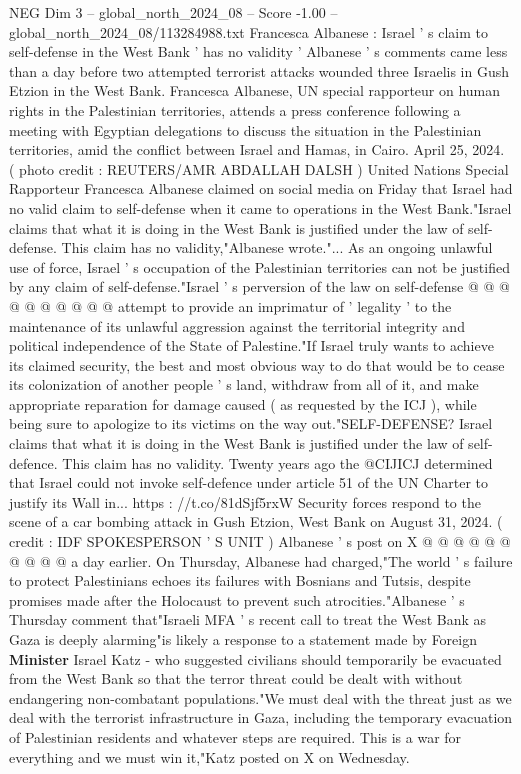 \begin{textsample}{NEG Dim 3 – global\_north\_2024\_08 – Score -1.00 – global\_north\_2024\_08/113284988.txt}  \label{ex:f3_neg_324}
Francesca Albanese : Israel ' s claim to self-defense in the West Bank ' has no validity ' Albanese ' s comments came less than a day before two attempted terrorist attacks wounded three Israelis in Gush Etzion in the West Bank.
Francesca Albanese, UN special rapporteur on human rights in the Palestinian territories, attends a press conference following a meeting with Egyptian delegations to discuss the situation in the Palestinian territories, amid the conflict between Israel and Hamas, in Cairo.
April 25, 2024. ( photo credit : REUTERS/AMR ABDALLAH DALSH ) United Nations Special Rapporteur Francesca Albanese claimed on social media on Friday that Israel had no valid claim to self-defense when it came to operations in the West Bank."Israel claims that what it is doing in the West Bank is justified under the law of self-defense.
This claim has no validity,"Albanese wrote."...
As an ongoing unlawful use of force, Israel ' s occupation of the Palestinian territories can not be justified by any claim of self-defense."Israel ' s perversion of the law on self-defense @ @ @ @ @ @ @ @ @ @ attempt to provide an imprimatur of ' legality ' to the maintenance of its unlawful aggression against the territorial integrity and political independence of the State of Palestine."If Israel truly wants to achieve its claimed security, the best and most obvious way to do that would be to cease its colonization of another people ' s land, withdraw from all of it, and make appropriate reparation for damage caused ( as requested by the ICJ ), while being sure to apologize to its victims on the way out."SELF-DEFENSE?
Israel claims that what it is doing in the West Bank is justified under the law of self-defence.
This claim has no validity.
Twenty years ago the @CIJICJ determined that Israel could not invoke self-defence under article 51 of the UN Charter to justify its Wall in... https : //t.co/81dSjf5rxW Security forces respond to the scene of a car bombing attack in Gush Etzion, West Bank on August 31, 2024. ( credit : IDF SPOKESPERSON ' S UNIT ) Albanese ' s post on X @ @ @ @ @ @ @ @ @ @ a day earlier.
On Thursday, Albanese had charged,"The world ' s failure to protect Palestinians echoes its failures with Bosnians and Tutsis, despite promises made after the Holocaust to prevent such atrocities."Albanese ' s Thursday comment that"Israeli MFA ' s recent call to treat the West Bank as Gaza is deeply alarming"is likely a response to a statement made by Foreign \textbf{Minister} Israel Katz - who suggested civilians should temporarily be evacuated from the West Bank so that the terror threat could be dealt with without endangering non-combatant populations."We must deal with the threat just as we deal with the terrorist infrastructure in Gaza, including the temporary evacuation of Palestinian residents and whatever steps are required.
This is a war for everything and we must win it,"Katz posted on X on Wednesday.

\end{textsample}
